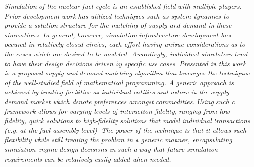 \textit
{ Simulation of the nuclear fuel cycle is an established field with multiple
  players.  Prior development work has utilized techniques such as system
  dynamics to provide a solution structure for the matching of supply and demand
  in these simulations. In general, however, simulation infrastructure
  development has occured in relatively closed circles, each effort having
  unique considerations as to the cases which are desired to be
  modeled. Accordingly, individual simulators tend to have their design
  decisions driven by specific use cases. Presented in this work is a proposed
  supply and demand matching algorithm that leverages the techniques of the
  well-studied field of mathematical programming. A generic approach is achieved
  by treating facilities as individual entities and actors in the supply-demand
  market which denote preferences amongst commodities. Using such a framework
  allows for varying levels of interaction fidelity, ranging from low-fidelity,
  quick solutions to high-fidelity solutions that model individual transactions
  (e.g. at the fuel-assembly level). The power of the technique is that it allows
  such flexibility while still treating the problem in a generic manner,
  encapsulating simulation engine design decisions in such a way that future
  simulation requirements can be relatively easily added when needed.  }
